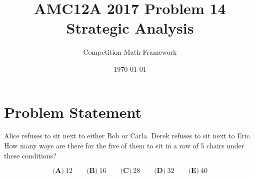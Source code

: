 \documentclass[]{article}
\begin{document}
\title{AMC12A 2017 Problem 14 Strategic Analysis}
\author{Competition Math Framework}
\date{\today}
\maketitle

\section*{Problem Statement}
Alice refuses to sit next to either Bob or Carla. Derek refuses to sit next to Eric. How many ways are there for the five of them to sit in a row of 5 chairs under these conditions?

\[\textbf{(A)}\ 12 \qquad \textbf{(B)}\ 16 \qquad\textbf{(C)}\ 28 \qquad\textbf{(D)}\ 32 \qquad\textbf{(E)}\ 40\]
\end{document}
